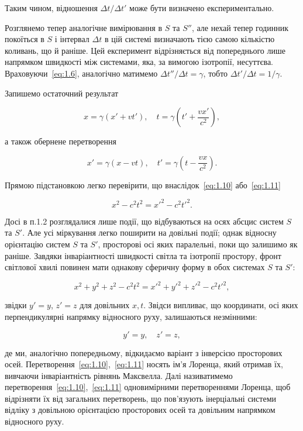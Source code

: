 Таким чином, відношення $\Delta t / \Delta t'$ може бути визначено експериментально.

Розглянемо тепер аналогічне вимірювання в $S$ та $S''$, але нехай тепер годинник покоїться в $S$ і інтервал $\Delta t$ в цій системі визначають тією самою кількістю коливань, що й раніше. Цей експеримент відрізняється від попереднього лише напрямком швидкості між системами, яка, за вимогою ізотропії, несуттєва. Враховуючи~\eqref{eq:1.6}, аналогічно матимемо $\Delta t'' / \Delta t = \gamma$, тобто $\Delta t' / \Delta t = 1/\gamma$.

Запишемо остаточний результат

\begin{equation}
x = \gamma (x' + v t'), \quad t = \gamma \left(t' + \frac{v x'}{c^2}\right),
\label{eq:1.10}
\end{equation}

а також обернене перетворення

\begin{equation}
x' = \gamma (x - v t), \quad t' = \gamma \left(t - \frac{v x}{c^2}\right).
\label{eq:1.11}
\end{equation}

Прямою підстановкою легко перевірити, що внаслідок~\eqref{eq:1.10} або~\eqref{eq:1.11}

\[
x^2 - c^2 t^2 = x'^2 - c^2 t'^2.
\]

Досі в п.1.2 розглядалися лише події, що відбуваються на осях абсцис систем $S$ та $S'$. Але усі міркування легко поширити на довільні події; однак відносну орієнтацію систем $S$ та $S'$, просторові осі яких паралельні, поки що залишимо як раніше. Завдяки інваріантності швидкості світла та ізотропії простору, фронт світлової хвилі повинен мати однакову сферичну форму в обох системах $S$ та $S'$:

\[
x^2 + y^2 + z^2 - c^2 t^2 = x'^2 + y'^2 + z'^2 - c^2 t'^2,
\]

звідки $y' = y$, $z' = z$ для довільних $x, t$. Звідси випливає, що координати, осі яких перпендикулярні напрямку відносного руху, залишаються незмінними:

\begin{equation}
y' = y, \quad z' = z,
\label{eq:1.11a}
\end{equation}

де ми, аналогічно попередньому, відкидаємо варіант з інверсією просторових осей. Перетворення~\eqref{eq:1.10},~\eqref{eq:1.11} носять ім’я Лоренца, який отримав їх, вивчаючи інваріантність рівнянь Максвелла. Далі називатимемо перетворення~\eqref{eq:1.10},~\eqref{eq:1.11} одновимірними перетвореннями Лоренца, щоб відрізняти їх від загальних перетворень, що пов'язують інерціальні системи відліку з довільною орієнтацією просторових осей та довільним напрямком відносного руху.

